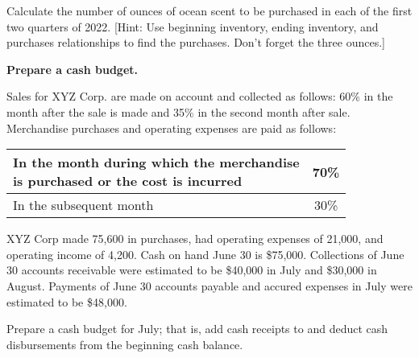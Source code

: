\documentclass{scrartcl}
\begin{document}
\bigskip

Calculate the number of ounces of ocean scent to be purchased in
each of the first two quarters of 2022.
[Hint: Use beginning inventory, ending inventory, and purchases 
relationships to find the purchases. Don't forget the three ounces.]

\vspace{10em}

\textbf{Prepare a cash budget.}

Sales for XYZ Corp. are made on account and collected as follows:
60\% in the month after the sale is made 
and 35\% in the second month after sale.
Merchandise purchases and operating expenses are paid as follows:

\medskip

\begin{tabular}{|l|c|} \hline
	\makecell{In the month during which the merchandise \\ 
	is purchased or
	the cost is incurred} & 70\% \\ \hline
	In the subsequent month & 30\% \\ \hline
\end{tabular}

\medskip

XYZ Corp made 75,600 in purchases,
had operating expenses of 21,000,
and operating income of 4,200. 
Cash on hand June 30 is \$75,000.
Collections of June 30 accounts receivable were estimated
to be \$40,000 in July and \$30,000 in August.
Payments of June 30 accounts payable and accured expenses in 
July were estimated to be \$48,000.

Prepare a cash budget for July; that is, add cash receipts to and
deduct cash disbursements from the beginning cash balance. 
\end{document}

